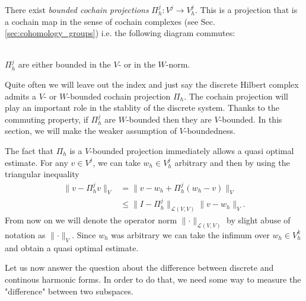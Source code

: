 \documentclass[../master_thesis.tex]{subfiles}
\begin{document}
\begin{assumption}
    There exist  \textit{bounded cochain projections} $\Pi^j_h : V^j \rightarrow V^j_h$. 
    This is a projection that is a cochain map in the sense of cochain complexes 
    (see Sec.\,\ref{sec:cohomology_groups}) i.e. 
    the following diagram commutes: 
    \\
    \\   
    $\Pi^j_h$ are either bounded in the $V$- or in the $W$-norm. 
\end{assumption}
Quite often we will leave out the index and just say the discrete Hilbert complex admits a 
$V$- or $W$-bounded cochain projection $\Pi_h$.
The cochain projection will play an important 
role in the stablity of the discrete system. 
Thanks to the commuting property, if $\Pi^j_h$ are $W$-bounded then they are $V$-bounded. 
In this section, we will make 
the weaker assumption of $V$-boundedness.

The fact that $\Pi_h$ is a $V$-bounded projection immediately allows a quasi 
optimal estimate. For any $v \in V^j$,  we can take 
$w_h \in V^j_h$ arbitrary and then by using the triangular inequality
\begin{align}
    \lVert v - \Pi^j_h v \rVert _V
    &=  \lVert v - w_h  + \Pi^j_h  (w_h - v) \rVert _V
    \\ &\leq \lVert I - \Pi^j_h\rVert _{\mathcal{L}(V,V)} \lVert v - w_h \rVert _V. 
    \label{eq:bound_projection}
\end{align}
From now on we will denote the operator norm $\lVert \cdot \rVert _{\mathcal{L}(V,V)}$ 
by slight abuse of notation as $\lVert \cdot \rVert _V$.
Since $w_h$ was arbitrary we can take the infimum over $w_h \in V_h^k$ and obtain 
a quasi optimal estimate. 

Let us now answer the question about the difference between discrete and continous 
harmonic forms. In order to do that, we need some way to measure the "difference" 
between two subspaces. 
\end{document}
